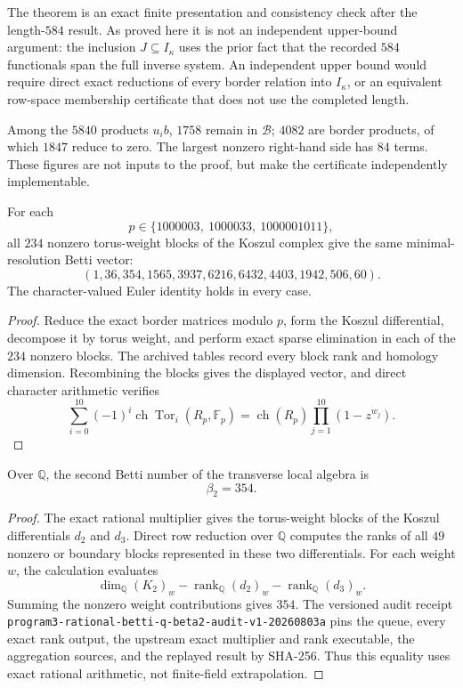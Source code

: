 \begin{remark}
The theorem is an exact finite presentation and consistency check after the
length-\(584\) result.  As proved here it is not an independent upper-bound
argument: the inclusion \(J\subseteq I_\kappa\) uses the prior fact that the
recorded \(584\) functionals span the full inverse system.  An independent
upper bound would require direct exact reductions of every border relation
into \(I_\kappa\), or an equivalent row-space membership certificate that
does not use the completed length.
\end{remark}

Among the \(5840\) products \(u_i b\), \(1758\) remain in \(\mathcal B\);
\(4082\) are border products, of which \(1847\) reduce to zero.  The largest
nonzero right-hand side has \(84\) terms.  These figures are not inputs to
the proof, but make the certificate independently implementable.

\begin{theorem}
\label{thm:three-prime-betti}
For each
\[
p\in\{1000003,\ 1000033,\ 1000001011\},
\]
all \(234\) nonzero torus-weight blocks of the Koszul complex give the same
minimal-resolution Betti vector:
\[
\boxed{
(1,36,354,1565,3937,6216,6432,4403,1942,506,60).
}
\]
The character-valued Euler identity holds in every case.
\end{theorem}

\begin{proof}
Reduce the exact border matrices modulo \(p\), form the Koszul differential,
decompose it by torus weight, and perform exact sparse elimination in each
of the \(234\) nonzero blocks.  The archived tables record every block rank
and homology dimension.  Recombining the blocks gives the displayed vector,
and direct character arithmetic verifies
\[
\sum_{i=0}^{10}(-1)^i\operatorname{ch}
\operatorname{Tor}_i(R_p,\mathbb F_p)
=\operatorname{ch}(R_p)\prod_{j=1}^{10}(1-z^{w_j}).
\]
\end{proof}

\begin{theorem}
\label{thm:rational-beta-two}
Over \(\mathbb Q\), the second Betti number of the transverse local algebra is
\[
\boxed{\beta_2=354}.
\]
\end{theorem}

\begin{proof}
The exact rational multiplier gives the torus-weight blocks of the Koszul
differentials \(d_2\) and \(d_3\). Direct row reduction over \(\mathbb Q\)
computes the ranks of all \(49\) nonzero or boundary blocks represented in
these two differentials. For each weight \(w\), the calculation evaluates
\[
\dim_{\mathbb Q}(K_2)_w
-\operatorname{rank}_{\mathbb Q}(d_2)_w
-\operatorname{rank}_{\mathbb Q}(d_3)_w.
\]
Summing the nonzero weight contributions gives \(354\). The versioned audit
receipt
\texttt{program3-rational-betti-q-beta2-audit-v1-20260803a}
pins the queue, every exact rank output, the upstream exact multiplier and
rank executable, the aggregation sources, and the replayed result by
SHA-256. Thus this equality uses exact rational arithmetic, not
finite-field extrapolation.
\end{proof}

